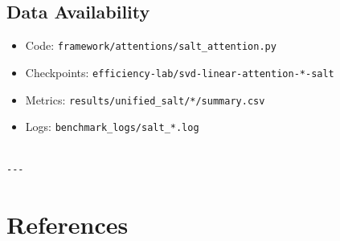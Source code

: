 \subsection{Data Availability}

\begin{itemize}
\item Code: \texttt{framework/attentions/salt\_attention.py}
\item Checkpoints: \texttt{efficiency-lab/svd-linear-attention-*-salt}
\item Metrics: \texttt{results/unified\_salt/*/summary.csv}
\item Logs: \texttt{benchmark\_logs/salt\_*.log}
\end{itemize}
\begin{lstlisting}

---
\end{lstlisting}


\section{References}

